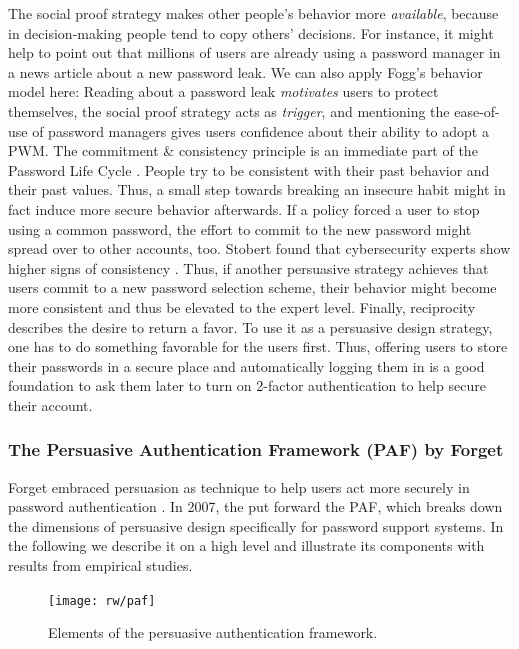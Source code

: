 	The social proof strategy makes other people's behavior more \textit{available}, because in decision-making people tend to copy others' decisions. For instance, it might help to point out that millions of users are already using a password manager in a news article about a new password leak. We can also apply Fogg's behavior model here: Reading about a password leak \textit{motivates} users to protect themselves, the social proof strategy acts as \textit{trigger}, and mentioning the ease-of-use of password managers gives users confidence about their ability to adopt a \gls{PWM}. 
	The commitment \& consistency principle is an immediate part of the Password Life Cycle \cite{Stobert2014PasswordLifeCycle}. People try to be consistent with their past behavior and their past values. Thus, a small step towards breaking an insecure habit might in fact induce more secure behavior afterwards. If a policy forced a user to stop using a common password, the effort to commit to the new password might spread over to other accounts, too. Stobert found that cybersecurity experts show higher signs of consistency \cite{Stobert2015ExpertPassword}. Thus, if another persuasive strategy achieves that users commit to a new password selection scheme, their behavior might become more consistent and thus be elevated to the expert level. 
	Finally, reciprocity describes the desire to return a favor. To use it as a persuasive design strategy, one has to do something favorable for the users first. Thus, offering users to store their passwords in a secure place and automatically logging them in is a good foundation to ask them later to turn on 2-factor authentication to help secure their account.
	
	\subsubsection{The Persuasive Authentication Framework (PAF) by Forget \etal}
	Forget \etal embraced persuasion as technique to help users act more securely in password authentication \cite{Forget2007PersuasionEducationSecurity}. In 2007, the put forward the \gls{PAF}, which breaks down the dimensions of persuasive design specifically for password support systems. In the following we describe it on a high level and illustrate its components with results from empirical studies. 
	
	\begin{figure}
		\centering
		\texttt{[image: rw/paf]}
		\caption{\label{fig:rw:paf} Elements of the persuasive authentication framework.}
	\end{figure}

